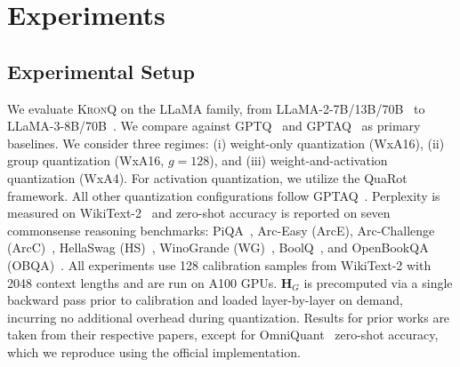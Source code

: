 \documentclass{article} %
\newcommand{\KronQ}{\textsc{KronQ}}
\begin{document}

\vspace{-3mm}
\section{Experiments}
\label{sec:experiments}
\vspace{-3mm}
\subsection{Experimental Setup}
\label{sec:exp:setup}
\vspace{-2mm}
We evaluate \KronQ{} on the LLaMA family, from LLaMA-2-7B/13B/70B~\citep{touvron2023llama} to LLaMA-3-8B/70B~\citep{grattafiori2024llama}. We compare against GPTQ~\citep{frantar2022gptq} and GPTAQ~\citep{li2025gptaq} as primary baselines. We consider three regimes: (i) weight-only quantization (WxA16), (ii) group quantization (WxA16, $g{=}128$), and (iii) weight-and-activation quantization (WxA4). For activation quantization, we utilize the QuaRot~\citep{ashkboos2024quarot} framework. All other quantization configurations follow GPTAQ~\citep{li2025gptaq}. Perplexity is measured on WikiText-2~\citep{merity2016pointer} and zero-shot accuracy is reported on seven commonsense reasoning benchmarks: PiQA~\citep{bisk2020piqa}, Arc-Easy (ArcE), Arc-Challenge (ArcC)~\citep{clark2018think}, HellaSwag (HS)~\citep{zellers2019hellaswag}, WinoGrande (WG)~\citep{sakaguchi2021winogrande}, BoolQ~\citep{clark2019boolq}, and OpenBookQA (OBQA)~\citep{mihaylov2018can}. All experiments use 128 calibration samples from WikiText-2 with 2048 context lengths and are run on A100 GPUs. $\mathbf{H}_G$ is precomputed via a single backward pass prior to calibration and loaded layer-by-layer on demand, incurring no additional overhead during quantization. Results for prior works are taken from their respective papers, except for OmniQuant~\citep{shao2023omniquant} zero-shot accuracy, which we reproduce using the official implementation. 
\end{document}
